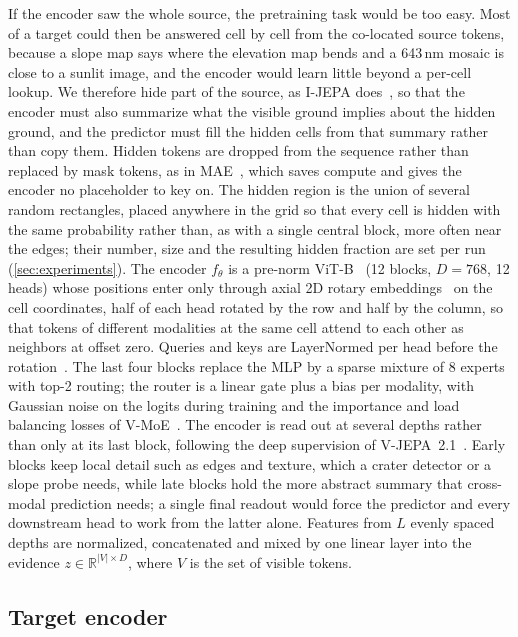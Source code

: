 If the encoder saw the whole source, the pretraining task would be too easy. Most of a target could then be answered cell by cell from the co-located source tokens, because a slope map says where the elevation map bends and a 643\,nm mosaic is close to a sunlit image, and the encoder would learn little beyond a per-cell lookup. We therefore hide part of the source, as I-JEPA does~\cite{assran2023self}, so that the encoder must also summarize what the visible ground implies about the hidden ground, and the predictor must fill the hidden cells from that summary rather than copy them. Hidden tokens are dropped from the sequence rather than replaced by mask tokens, as in MAE~\cite{he2022masked}, which saves compute and gives the encoder no placeholder to key on. The hidden region is the union of several random rectangles, placed anywhere in the grid so that every cell is hidden with the same probability rather than, as with a single central block, more often near the edges; their number, size and the resulting hidden fraction are set per run (\cref{sec:experiments}). The encoder $f_\theta$ is a pre-norm ViT-B~\cite{dosovitskiy2021image} (12 blocks, $D{=}768$, 12 heads) whose positions enter only through axial 2D rotary embeddings~\cite{su2024roformer,heo2024rotary} on the cell coordinates, half of each head rotated by the row and half by the column, so that tokens of different modalities at the same cell attend to each other as neighbors at offset zero. Queries and keys are LayerNormed per head before the rotation~\cite{dehghani2023scaling}. The last four blocks replace the MLP by a sparse mixture of 8 experts with top-2 routing; the router is a linear gate plus a bias per modality, with Gaussian noise on the logits during training and the importance and load balancing losses of V-MoE~\cite{riquelme2021scaling}. The encoder is read out at several depths rather than only at its last block, following the deep supervision of V-JEPA~2.1~\cite{murlabadia2026vjepa}. Early blocks keep local detail such as edges and texture, which a crater detector or a slope probe needs, while late blocks hold the more abstract summary that cross-modal prediction needs; a single final readout would force the predictor and every downstream head to work from the latter alone. Features from $L$ evenly spaced depths are normalized, concatenated and mixed by one linear layer into the evidence $z \in \mathbb{R}^{|V|\times D}$, where $V$ is the set of visible tokens.

\subsection{Target encoder}
\label{sec:target}

